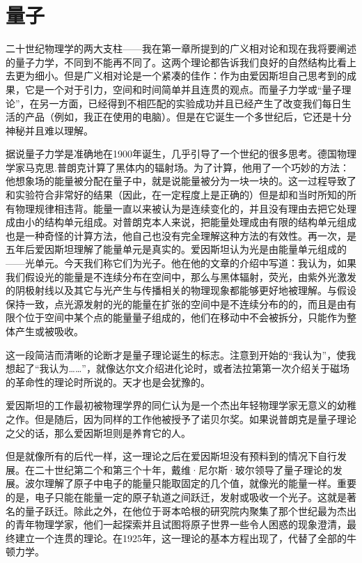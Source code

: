	\chapter{量子}
\indent

    二十世纪物理学的两大支柱——我在第一章所提到的广义相对论和现在我将要阐述的量子力学，不同到不能再不同了。这两个理论都告诉我们良好的自然结构比看上去更为细小。但是广义相对论是一个紧凑的佳作：作为由爱因斯坦自己思考到的成果，它是一个对于引力，空间和时间简单并且连贯的观点。而量子力学或“量子理论”，在另一方面，已经得到不相匹配的实验成功并且已经产生了改变我们每日生活的产品（例如，我正在使用的电脑）。但是在它诞生一个多世纪后，它还是十分神秘并且难以理解。

  据说量子力学是准确地在1900年诞生，几乎引导了一个世纪的很多思考。德国物理学家马克思.普朗克计算了黑体内的辐射场。为了计算，他用了一个巧妙的方法：他想象场的能量被分配在量子中，就是说能量被分为一块一块的。这一过程导致了和实验符合非常好的结果（因此，在一定程度上是正确的）但是却和当时所知的所有物理规律相违背。能量一直以来被认为是连续变化的，并且没有理由去把它处理成由小的结构单元组成。对普朗克本人来说，把能量处理成由有限的结构单元组成也是一种奇怪的计算方法，他自己也没有完全理解这种方法的有效性。再一次，是五年后爱因斯坦理解了能量单元是真实的。爱因斯坦认为光是由能量单元组成的——光单元。今天我们称它们为光子。他在他的文章的介绍中写道：我认为，如果我们假设光的能量是不连续分布在空间中，那么与黑体辐射，荧光，由紫外光激发的阴极射线以及其它与光产生与传播相关的物理现象都能够更好地被理解。与假设保持一致，点光源发射的光的能量在扩张的空间中是不连续分布的的，而且是由有限个位于空间中某个点的能量量子组成的，他们在移动中不会被拆分，只能作为整体产生或被吸收。

  这一段简洁而清晰的论断才是量子理论诞生的标志。注意到开始的“我认为”，使我想起了“我认为……”，就像达尔文介绍进化论时，或者法拉第第一次介绍关于磁场的革命性的理论时所说的。天才也是会犹豫的。

  爱因斯坦的工作最初被物理学界的同仁认为是一个杰出年轻物理学家无意义的幼稚之作。但是随后，因为同样的工作他被授予了诺贝尔奖。如果说普朗克是量子理论之父的话，那么爱因斯坦则是养育它的人。

  但是就像所有的后代一样，这一理论之后在爱因斯坦没有预料到的情况下自行发展。在二十世纪第二个和第三个十年，戴维·尼尔斯·玻尔领导了量子理论的发展。波尔理解了原子中电子的能量只能取固定的几个值，就像光的能量一样。重要的是，电子只能在能量一定的原子轨道之间跃迁，发射或吸收一个光子。这就是著名的量子跃迁。除此之外，在他位于哥本哈根的研究院内聚集了那个世纪最为杰出的青年物理学家，他们一起探索并且试图将原子世界一些令人困惑的现象澄清，最终建立一个连贯的理论。在1925年，这一理论的基本方程出现了，代替了全部的牛顿力学。

